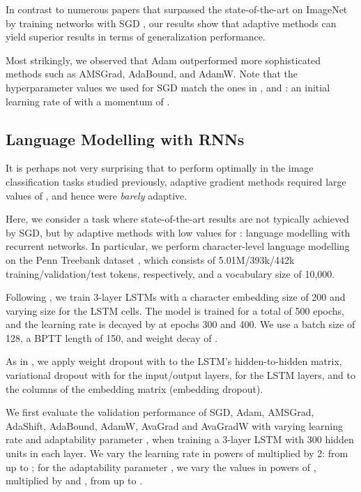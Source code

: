 \documentclass{article}
\begin{document}
In contrast to numerous papers that surpassed the state-of-the-art on ImageNet by training networks with SGD \citep{vgg, googlenet, resnet1, resnet2, wide, resnext}, our results show that adaptive methods can yield superior results in terms of generalization performance.

Most strikingly, we observed that Adam outperformed more sophisticated methods such as AMSGrad, AdaBound, and AdamW.  Note that the hyperparameter values we used for SGD match the ones in
\citet{resnet1}, \citet{resnet2} and \citet{gross}: an initial learning rate of
 with a momentum of . 


\subsection{Language Modelling with RNNs}

It is perhaps not very surprising that to perform optimally in the image
classification tasks studied previously, adaptive gradient methods required
large values of , and hence were \emph{barely} adaptive.

Here, we
consider a task where state-of-the-art results are not typically achieved by SGD, but by
adaptive methods with low values for : language modelling with
recurrent networks. In particular, we perform character-level language
modelling on the Penn Treebank dataset \citep{ptb,ptbc}, which consists of 5.01M/393k/442k training/validation/test tokens, respectively, and a vocabulary size of 10,000.

Following \citet{awd}, we train 3-layer LSTMs \citep{lstm} with a character embedding size of 200 and varying size for the LSTM cells. The model is trained for a total of 500 epochs,
and the learning rate is decayed by  at epochs 300 and 400.  We use a batch size
of 128, a BPTT length of 150, and weight decay of .

As in \citet{awd}, we apply weight dropout with  to the LSTM's hidden-to-hidden matrix, variational dropout \citep{variationaldropout} with  for the input/output layers,  for the LSTM layers, and  to the columns of the embedding matrix (embedding dropout).

We first evaluate the validation performance of SGD, Adam, AMSGrad, AdaShift, AdaBound, AdamW,
AvaGrad and AvaGradW with varying learning rate  and adaptability
parameter , when training a 3-layer LSTM with 300 hidden
units in each layer. We vary the learning rate  in powers of  multiplied by 2: from  up to ; for the adaptability parameter , we vary the values in powers of , multiplied by  and , from  up to .
\end{document}
